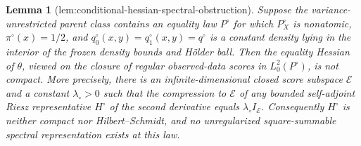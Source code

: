 \documentclass{article}
\newtheorem{lemma}{Lemma}
\begin{document}
\begin{lemma}[lem:conditional-hessian-spectral-obstruction]\label{lem:conditional-hessian-spectral-obstruction}
Suppose the variance-unrestricted parent class contains an equality law \(P^\circ\) for which \(P_X^\circ\) is nonatomic, \(\pi^\circ(x)=1/2\), and \(q_0^\circ(x,y)=q_1^\circ(x,y)=q^\circ\) is a constant density lying in the interior of the frozen density bounds and H\"older ball. Then the equality Hessian of \(\theta\), viewed on the closure of regular observed-data scores in \(L_0^2(P^\circ)\), is not compact. More precisely, there is an infinite-dimensional closed score subspace \(\mathcal E\) and a constant \(\lambda_\circ>0\) such that the compression to \(\mathcal E\) of any bounded self-adjoint Riesz representative \(H^\circ\) of the second derivative equals \(\lambda_\circ I_{\mathcal E}\). Consequently \(H^\circ\) is neither compact nor Hilbert--Schmidt, and no unregularized square-summable spectral representation exists at this law.
\end{lemma}
\end{document}
